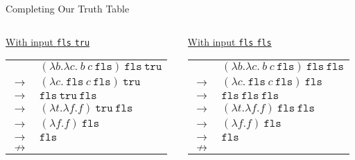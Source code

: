 \documentclass[11pt]{beamer}
\begin{document}
\begin{frame}[fragile=singleslide]{Completing Our Truth Table}
\begin{columns}
\begin{column}{0.5\textwidth}
\begin{center}
\underline{With input \texttt{fls} \texttt{tru}}
\begin{tabular}{c l}
& $(\lambda b. \lambda c.\:b\:c\:\texttt{fls})\:\texttt{fls}\:\texttt{tru}$ \\ 
$\rightarrow$ & $(\lambda c.\:\texttt{fls}\:c\:\texttt{fls})\:\texttt{tru}$ \\
$\rightarrow$ & $\texttt{fls}\:\texttt{tru}\:\texttt{fls}$ \\
$\rightarrow$ & $(\lambda t. \lambda f. f)\:\texttt{tru}\:\texttt{fls}$ \\
$\rightarrow$ & $(\lambda f. f)\:\texttt{fls}$ \\
$\rightarrow$ & $\texttt{fls}$ \\
$\nrightarrow$ & \\
\end{tabular}
\end{center}

\end{column}
\begin{column}{0.5\textwidth}
\begin{center}
\underline{With input \texttt{fls} \texttt{fls}}
\begin{tabular}{c l}
& $(\lambda b. \lambda c.\:b\:c\:\texttt{fls})\:\texttt{fls}\:\texttt{fls}$ \\ 
$\rightarrow$ & $(\lambda c.\:\texttt{fls}\:c\:\texttt{fls})\:\texttt{fls}$ \\
$\rightarrow$ & $\texttt{fls}\:\texttt{fls}\:\texttt{fls}$ \\
$\rightarrow$ & $(\lambda t. \lambda f. f)\:\texttt{fls}\:\texttt{fls}$ \\
$\rightarrow$ & $(\lambda f. f)\:\texttt{fls}$ \\
$\rightarrow$ & $\texttt{fls}$ \\
$\nrightarrow$ & \\
\end{tabular}
\end{center}
\end{column}
\end{columns}
\end{frame}
\end{document}
